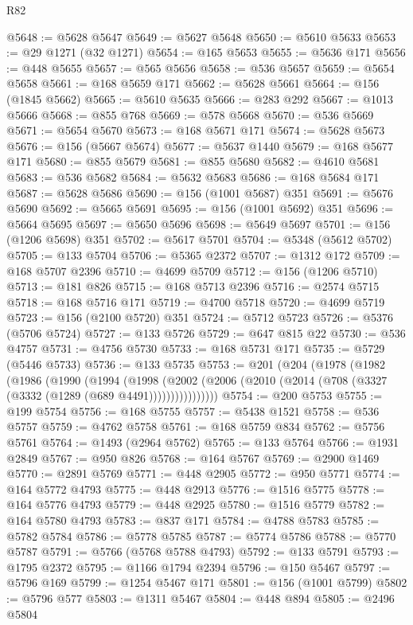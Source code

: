 \begin{lexlean}{R82}
\begin{coremodule}
@5648 := @5628 @5647
@5649 := @5627 @5648
@5650 := @5610 @5633
@5653 := @29 @1271 (@32 @1271)
@5654 := @165 @5653
@5655 := @5636 @171
@5656 := @448 @5655
@5657 := @565 @5656
@5658 := @536 @5657
@5659 := @5654 @5658
@5661 := @168 @5659 @171
@5662 := @5628 @5661
@5664 := @156 (@1845 @5662)
@5665 := @5610 @5635
@5666 := @283 @292
@5667 := @1013 @5666
@5668 := @855 @768
@5669 := @578 @5668
@5670 := @536 @5669
@5671 := @5654 @5670
@5673 := @168 @5671 @171
@5674 := @5628 @5673
@5676 := @156 (@5667 @5674)
@5677 := @5637 @1440
@5679 := @168 @5677 @171
@5680 := @855 @5679
@5681 := @855 @5680
@5682 := @4610 @5681
@5683 := @536 @5682
@5684 := @5632 @5683
@5686 := @168 @5684 @171
@5687 := @5628 @5686
@5690 := @156 (@1001 @5687) @351
@5691 := @5676 @5690
@5692 := @5665 @5691
@5695 := @156 (@1001 @5692) @351
@5696 := @5664 @5695
@5697 := @5650 @5696
@5698 := @5649 @5697
@5701 := @156 (@1206 @5698) @351
@5702 := @5617 @5701
@5704 := @5348 (@5612 @5702)
@5705 := @133 @5704
@5706 := @5365 @2372
@5707 := @1312 @172
@5709 := @168 @5707 @2396
@5710 := @4699 @5709
@5712 := @156 (@1206 @5710)
@5713 := @181 @826
@5715 := @168 @5713 @2396
@5716 := @2574 @5715
@5718 := @168 @5716 @171
@5719 := @4700 @5718
@5720 := @4699 @5719
@5723 := @156 (@2100 @5720) @351
@5724 := @5712 @5723
@5726 := @5376 (@5706 @5724)
@5727 := @133 @5726
@5729 := @647 @815 @22
@5730 := @536 @4757
@5731 := @4756 @5730
@5733 := @168 @5731 @171
@5735 := @5729 (@5446 @5733)
@5736 := @133 @5735
@5753 := @201
    (@204
      (@1978
        (@1982
          (@1986
            (@1990
              (@1994
                (@1998
                  (@2002 (@2006 (@2010 (@2014 (@708 (@3327 (@3332 (@1289 (@689 @4491))))))))))))))))
@5754 := @200 @5753
@5755 := @199 @5754
@5756 := @168 @5755
@5757 := @5438 @1521
@5758 := @536 @5757
@5759 := @4762 @5758
@5761 := @168 @5759 @834
@5762 := @5756 @5761
@5764 := @1493 (@2964 @5762)
@5765 := @133 @5764
@5766 := @1931 @2849
@5767 := @950 @826
@5768 := @164 @5767
@5769 := @2900 @1469
@5770 := @2891 @5769
@5771 := @448 @2905
@5772 := @950 @5771
@5774 := @164 @5772 @4793
@5775 := @448 @2913
@5776 := @1516 @5775
@5778 := @164 @5776 @4793
@5779 := @448 @2925
@5780 := @1516 @5779
@5782 := @164 @5780 @4793
@5783 := @837 @171
@5784 := @4788 @5783
@5785 := @5782 @5784
@5786 := @5778 @5785
@5787 := @5774 @5786
@5788 := @5770 @5787
@5791 := @5766 (@5768 @5788 @4793)
@5792 := @133 @5791
@5793 := @1795 @2372
@5795 := @1166 @1794 @2394
@5796 := @150 @5467
@5797 := @5796 @169
@5799 := @1254 @5467 @171
@5801 := @156 (@1001 @5799)
@5802 := @5796 @577
@5803 := @1311 @5467
@5804 := @448 @894
@5805 := @2496 @5804

\end{coremodule}
\end{lexlean}
